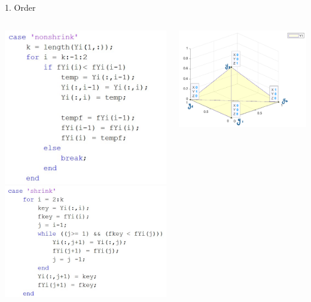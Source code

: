 \documentclass{beamer}
\begin{document}
\begin{frame}{1. Order}
	\begin{columns}
	\begin{column}{0.35\linewidth}
		\centering
		\includegraphics[width=0.95\linewidth]{Order1}
		\includegraphics[width=0.95\linewidth]{Shrink2}
	\end{column}
	\begin{column}{0.59\linewidth}
		\centering
		\includegraphics[width=0.95\linewidth]{Order1Fig}

\end{column}
\end{columns}
\end{frame}
\end{document}

